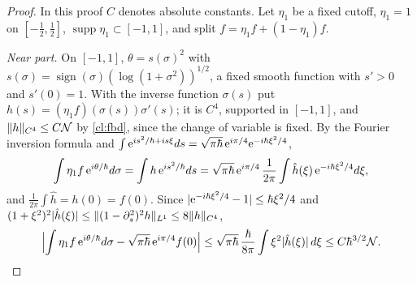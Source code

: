 \begin{proof}
In this proof $C$ denotes absolute constants. Let $\eta_1$ be a fixed cutoff, $\eta_1=1$ on $[-\tfrac12,\tfrac12]$,
$\operatorname{supp}\eta_1\subset[-1,1]$, and split $f=\eta_1f+(1-\eta_1)f$.

\emph{Near part.} On $[-1,1]$, $\theta=s(\sigma)^2$ with $s(\sigma)=\operatorname{sign}(\sigma)(\log(1+\sigma^2))^{1/2}$, a fixed smooth function with $s'>0$ and
$s'(0)=1$. With the inverse function $\sigma(s)$ put $h(s)=(\eta_1 f)(\sigma(s))\sigma'(s)$; it is $C^4$, supported in $[-1,1]$, and
$\lVert h\rVert_{C^4}\le C\mathcal N$ by \eqref{cl:fbd}, since the change of variable is fixed. By the Fourier inversion formula and
$\int\mathrm{e}^{is^2/\hbar+is\xi}ds=\sqrt{\pi\hbar}\,\mathrm{e}^{i\pi/4}\mathrm{e}^{-i\hbar\xi^2/4}$,
\[
\int\eta_1 f\,\mathrm{e}^{i\theta/\hbar}d\sigma=\int h\,\mathrm{e}^{is^2/\hbar}ds=\sqrt{\pi\hbar}\,\mathrm{e}^{i\pi/4}\,\frac1{2\pi}\int\hat h(\xi)\,\mathrm{e}^{-i\hbar\xi^2/4}d\xi ,
\]
and $\frac1{2\pi}\int\hat h=h(0)=f(0)$. Since $|\mathrm{e}^{-i\hbar\xi^2/4}-1|\le\hbar\xi^2/4$ and
$(1+\xi^2)^2|\hat h(\xi)|\le\lVert (1-\partial_s^2)^2h\rVert_{L^1}\le8\lVert h\rVert_{C^4}$,
\[
\Bigl|\int\eta_1 f\,\mathrm{e}^{i\theta/\hbar}d\sigma-\sqrt{\pi\hbar}\,\mathrm{e}^{i\pi/4}f(0)\Bigr|\le\sqrt{\pi\hbar}\,\frac\hbar{8\pi}\int\xi^2|\hat h(\xi)|\,d\xi\le C\hbar^{3/2}\mathcal N.
\]


\end{proof}
